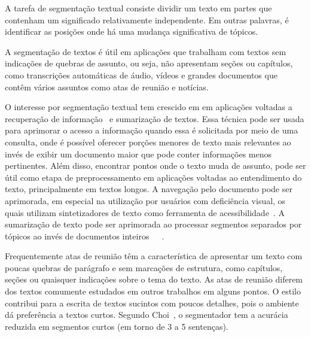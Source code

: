 A tarefa de segmentação textual consiste dividir um texto em partes que contenham um significado relativamente independente. Em outras palavras, é identificar as posições onde há uma mudança significativa de tópicos. 

A segmentação de textos é útil em aplicações que trabalham com textos sem indicações de quebras de assunto, ou seja, não apresentam seções ou capítulos, como transcrições automáticas de áudio, vídeos e grandes documentos que contêm vários assuntos como atas de reunião e notícias.


O interesse por segmentação textual tem crescido em em aplicações voltadas a recuperação de informação~\cite{Reynar1999} %
e sumarização de textos. %
Essa técnica pode ser usada para aprimorar o acesso a informação quando essa é solicitada por meio de uma consulta, onde é possível oferecer porções menores de texto mais relevantes ao invés de exibir um documento maior que pode conter informações menos pertinentes. 
%
Além disso, encontrar pontos onde o texto muda de assunto, pode ser útil como etapa de preprocessamento em aplicações voltadas ao entendimento do texto, principalmente em textos longos.
%
A navegação pelo documento pode ser aprimorada, em especial na utilização por usuários com deficiência visual, os quais utilizam  sintetizadores de texto como ferramenta de acessibilidade~\cite{Choi2000}. 
%
A sumarização de texto pode ser aprimorada ao processar segmentos separados por tópicos ao invés de documentos inteiros~\cite{Boguraev2000}~\cite{Boguraev2000b}~\cite{Dias2007}. 



%
Frequentemente atas de reunião têm a característica de apresentar um texto com poucas quebras de parágrafo e sem marcações de estrutura, como capítulos, seções ou quaisquer indicações sobre o tema do texto. 
%
As atas de reunião diferem dos textos comumente estudados em outros trabalhos em alguns pontos. O estilo contribui para a escrita de textos sucintos com poucos detalhes, pois o ambiente dá preferência a textos curtos. Segundo Choi~\cite{Choi2001-LSA}, o segmentador tem a acurácia reduzida em segmentos curtos (em torno de 3 a 5 sentenças). 

